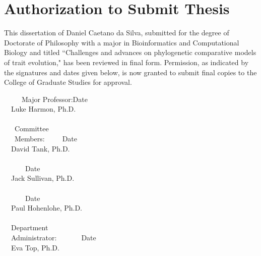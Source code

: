 \section*{\large{Authorization to Submit Thesis}}
\begin{flushleft}
This dissertation of Daniel Caetano da Silva, submitted for the degree of Doctorate of Philosophy with a major in Bioinformatics and Computational Biology and titled ``Challenges and advances on phylogenetic comparative models of trait evolution," has been reviewed in final form. Permission, as indicated by the signatures and dates given below, is now granted to submit final copies to the College of Graduate Studies for approval.
\end{flushleft}
\begin{singlespace}
\ \ \ \ \ Major Professor:\indent\underline{\makebox[2.8in][l]{\ }}Date\underline{\makebox[1.2in][l]{\ }}\\
\ \ \indent\indent\indent\indent\indent\indent\indent Luke Harmon, Ph.D.\\
\ \\
\ \ \ \indent Committee\\
\ \ \ \indent Members:\indent\indent\ \ \ \ \ \underline{\makebox[2.8in][l]{\ }}Date\underline{\makebox[1.2in][l]{\ }}\\
\ \ \indent\indent\indent\indent\indent\indent\indent David Tank, Ph.D.\\
\ \\
\ \ \indent\indent\indent\indent\indent\indent\ \ \ \ \underline{\makebox[2.8in][l]{\ }}Date\underline{\makebox[1.2in][l]{\ }}\\
\ \ \indent\indent\indent\indent\indent\indent\indent Jack Sullivan, Ph.D.\\
\ \\
\ \ \indent\indent\indent\indent\indent\indent\ \ \ \ \underline{\makebox[2.8in][l]{\ }}Date\underline{\makebox[1.2in][l]{\ }}\\
\ \ \indent\indent\indent\indent\indent\indent\indent Paul Hohenlohe, Ph.D.\\
\ \\
\ \ \indent Department\\
\ \ \indent Administrator:\ \ \ \ \ \ \ \underline{\makebox[2.8in][l]{\ }}Date\underline{\makebox[1.2in][l]{\ }}\\
\ \ \indent\indent\indent\indent\indent\indent\indent Eva Top, Ph.D.\\

\end{singlespace}
\pagebreak

